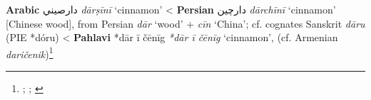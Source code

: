 \begin{etymology}\label{ety:darsini}
\textbf{Arabic} {دارصيني} \textit{dārṣīnī} `cinnamon'
< \textbf{Persian} {دارچین} \textit{dārchīnī} `cinnamon' [Chinese wood], from Persian \textit{dār} `wood' + \textit{cīn} `China'; cf. cognates Sanskrit \textit{dāru} (PIE *dóru)
< \textbf{Pahlavi} {*dār ī čēnīg} \textit{*dār ī čēnīg} `cinnamon', (cf. Armenian \textit{daričenik})\footnote{\textcite[311]{wehr_dictionary_1976}; \textcite{dietrich_dar_2004}; \textcite{alam_darcini_2011}}
\end{etymology}